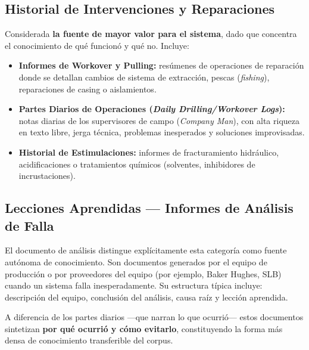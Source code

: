 \documentclass[12pt, a4paper]{article}
\begin{document}
\subsection{Historial de Intervenciones y Reparaciones}

Considerada \textbf{la fuente de mayor valor para el sistema}, dado que concentra el
conocimiento de qu\'{e} funcion\'{o} y qu\'{e} no. Incluye:

\begin{itemize}
  \item \textbf{Informes de Workover y Pulling:} res\'{u}menes de operaciones de reparaci\'{o}n
        donde se detallan cambios de sistema de extracci\'{o}n, pescas (\textit{fishing}),
        reparaciones de casing o aislamientos.
  \item \textbf{Partes Diarios de Operaciones (\textit{Daily Drilling/Workover Logs}):} notas
        diarias de los supervisores de campo (\textit{Company Man}), con alta riqueza en texto
        libre, jerga t\'{e}cnica, problemas inesperados y soluciones improvisadas.
  \item \textbf{Historial de Estimulaciones:} informes de fracturamiento hidr\'{a}ulico,
        acidificaciones o tratamientos qu\'{i}micos (solventes, inhibidores de incrustaciones).
\end{itemize}

\subsection{Lecciones Aprendidas --- Informes de An\'{a}lisis de Falla}

El documento de an\'{a}lisis distingue expl\'{i}citamente esta categor\'{i}a como fuente
aut\'{o}noma de conocimiento. Son documentos generados por el equipo de producci\'{o}n o
por proveedores del equipo (por ejemplo, Baker Hughes, SLB) cuando un sistema falla
inesperadamente. Su estructura t\'{i}pica incluye: descripci\'{o}n del equipo, conclusi\'{o}n
del an\'{a}lisis, causa ra\'{i}z y lecci\'{o}n aprendida.

A diferencia de los partes diarios ---que narran lo que ocurri\'{o}--- estos documentos
sintetizan \textbf{por qu\'{e} ocurri\'{o} y c\'{o}mo evitarlo}, constituyendo la forma m\'{a}s
densa de conocimiento transferible del corpus.

\end{document}
